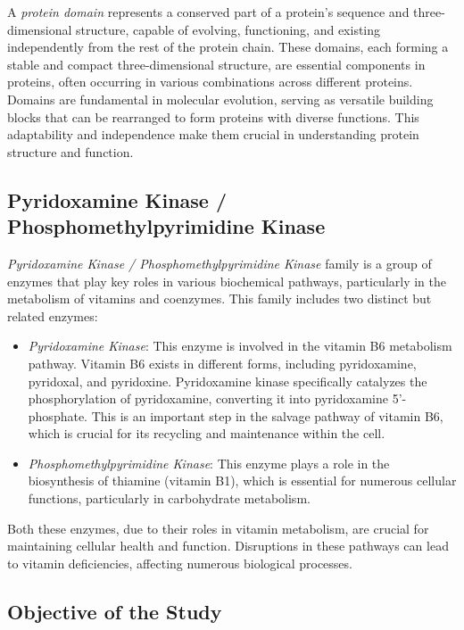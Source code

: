 \documentclass[10pt,twocolumn,letterpaper]{article}
\begin{document}
A \textit{protein domain} represents a conserved part of a protein's sequence and three-dimensional structure, capable of evolving, functioning, and existing independently from the rest of the protein chain. These domains, each forming a stable and compact three-dimensional structure, are essential components in proteins, often occurring in various combinations across different proteins. Domains are fundamental in molecular evolution, serving as versatile building blocks that can be rearranged to form proteins with diverse functions. This adaptability and independence make them crucial in understanding protein structure and function.

\subsection{Pyridoxamine Kinase / Phosphomethylpyrimidine Kinase}

\textit{Pyridoxamine Kinase / Phosphomethylpyrimidine Kinase} family is a group of enzymes that play key roles in various biochemical pathways, particularly in the metabolism of vitamins and coenzymes. This family includes two distinct but related enzymes:

\begin{itemize}
\item \textit{Pyridoxamine Kinase}: This enzyme is involved in the vitamin B6 metabolism pathway. Vitamin B6 exists in different forms, including pyridoxamine, pyridoxal, and pyridoxine. Pyridoxamine kinase specifically catalyzes the phosphorylation of pyridoxamine, converting it into pyridoxamine 5'-phosphate. This is an important step in the salvage pathway of vitamin B6, which is crucial for its recycling and maintenance within the cell.

\item \textit{Phosphomethylpyrimidine Kinase}: This enzyme plays a role in the biosynthesis of thiamine (vitamin B1), which is essential for numerous cellular functions, particularly in carbohydrate metabolism.
\end{itemize}

Both these enzymes, due to their roles in vitamin metabolism, are crucial for maintaining cellular health and function. Disruptions in these pathways can lead to vitamin deficiencies, affecting numerous biological processes.

\subsection{Objective of the Study}
\end{document}
